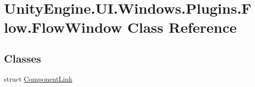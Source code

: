 \hypertarget{class_unity_engine_1_1_u_i_1_1_windows_1_1_plugins_1_1_flow_1_1_flow_window}{}\section{Unity\+Engine.\+U\+I.\+Windows.\+Plugins.\+Flow.\+Flow\+Window Class Reference}
\label{class_unity_engine_1_1_u_i_1_1_windows_1_1_plugins_1_1_flow_1_1_flow_window}
\subsection*{Classes}
\begin{DoxyCompactItemize}
\item 
struct \hyperlink{struct_unity_engine_1_1_u_i_1_1_windows_1_1_plugins_1_1_flow_1_1_flow_window_1_1_component_link}{Component\+Link}
\end{DoxyCompactItemize}
